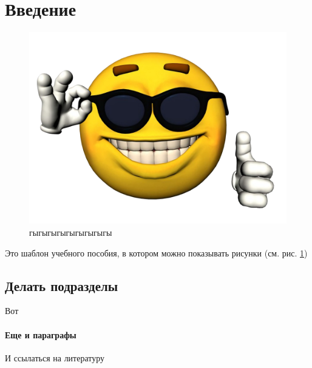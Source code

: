 \section{Введение}

\begin{figure}[H]
	\centering
	\includegraphics[scale=0.55]{img/smile.png}
	\caption{гыгыгыгыгыгыгыгыгы}
	\label{fig:gygygy}
\end{figure}

Это шаблон учебного пособия, в котором можно показывать рисунки (см. рис. \ref{fig:gygygy})

\subsection{Делать подразделы}
Вот

\paragraph{Еще и параграфы}
И ссылаться на литературу \cite{priest}

